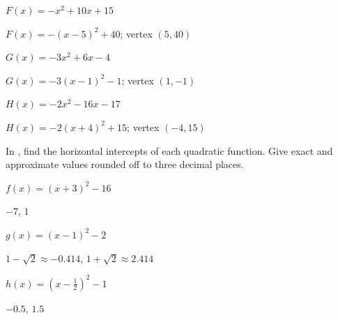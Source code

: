\begin{exercise}
$F(x)=-x^2+10 x+15$
\end{exercise}

\begin{solution}
    $F(x)=-\left(x-5\right)^2+40$; vertex $(5,40)$
\end{solution}



\begin{exercise}
$G(x)=-3 x^2+6 x-4$
\end{exercise}

\begin{solution}
    $G(x)=-3(x-1)^2-1$; vertex $(1,-1)$
\end{solution}



\begin{exercise}\label{exercise-3.3.14}
$H(x)=-2 x^2-16 x-17$
\end{exercise}

\begin{solution}
    $H(x)=-2\left(x+4\right)^2+15$; vertex $(-4,15)$
\end{solution}







\noindent In , find the horizontal intercepts of each quadratic function. Give exact and approximate values rounded off to three decimal places.


\begin{exercise}\label{exercise-3.3.15}
$f(x)=(x+3)^2-16$
\end{exercise}

\begin{solution}
    $-7$, $1$
\end{solution}



\begin{exercise}
$g(x)=(x-1)^2-2$
\end{exercise}

\begin{solution}
     $1-\sqrt{2}\approx-0.414$, $1+\sqrt{2}\approx2.414$
\end{solution}



\begin{exercise}
$h(x)=(x-\frac{1}{2})^2-1$
\end{exercise}

\begin{solution}
 $-0.5$, $1.5$
\end{solution}




